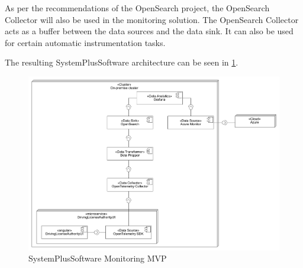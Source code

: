As per the recommendations of the OpenSearch project, the OpenSearch Collector will also be used
in the monitoring solution. The OpenSearch Collector acts as a buffer between the data sources
and the data sink. It can also be used for certain automatic instrumentation tasks.

The resulting SystemPlusSoftware architecture can be seen in \ref{fig:sps_monitoring_mvp}.

\begin{figure}[h]
	\centering
	\includegraphics[width=\textwidth]{figures/sps_monitoring_mvp.png}
	\caption{SystemPlusSoftware Monitoring MVP}
	\label{fig:sps_monitoring_mvp}
\end{figure}

